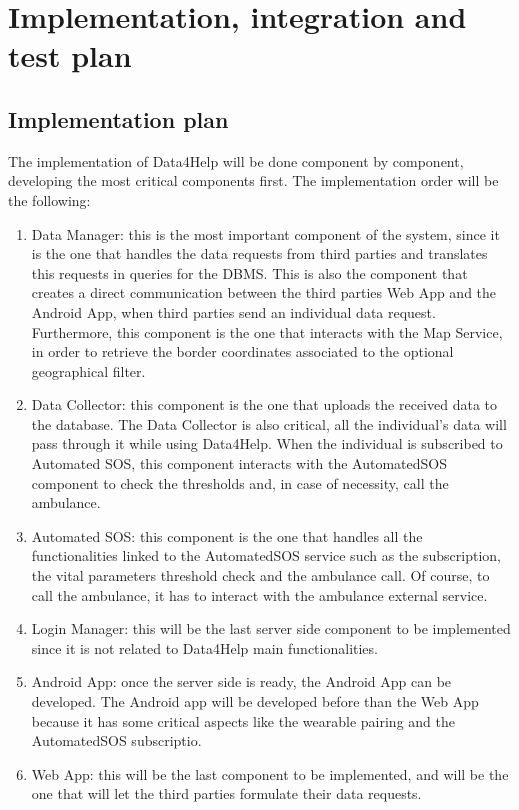 \chapter{Implementation, integration and test plan}
\section{Implementation plan}
The implementation of Data4Help will be done component by component, developing the most critical components first.
The implementation order will be the following:
\begin{enumerate}
\item Data Manager: this is the most important component of the system, since it is the one that handles the data requests from third parties and translates this requests in queries for the DBMS. 
This is also the component that creates a direct communication between the third parties Web App and the Android App, when third parties send an individual data request.\\
Furthermore, this component is the one that interacts with the Map Service, in order to retrieve the border coordinates associated to the optional geographical filter.
\item Data Collector: this component is the one that uploads the received data to the database. The Data Collector is also critical, all the individual's data will pass through it while using Data4Help. 
When the individual is subscribed to Automated SOS, this component interacts with the AutomatedSOS component to check the thresholds and, in case of necessity, call the ambulance.
\item Automated SOS: this component is the one that handles all the functionalities linked to the AutomatedSOS service such as the subscription, the vital parameters threshold check and the ambulance call. Of course, to call the ambulance, it has to interact with the ambulance external service.
\item Login Manager: this will be the last server side component to be implemented since it is not related to Data4Help main functionalities.
\item Android App: once the server side is ready, the Android App can be developed. The Android app will be developed before than the Web App because it has some critical aspects like the wearable pairing and the AutomatedSOS subscriptio.
\item Web App: this will be the last component to be implemented, and will be the one that will let the third parties formulate their data requests.
\end{enumerate}

